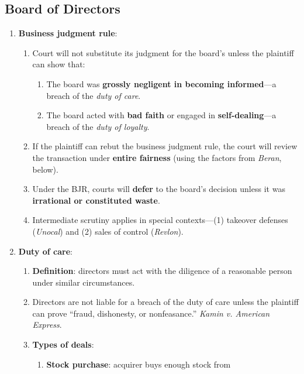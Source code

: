 \newpage

\subsection{Board of Directors}

\begin{enumerate}
    \item \textbf{Business judgment rule}:
    \begin{enumerate}
        \item Court will not substitute its judgment for the board's unless 
        the plaintiff can show that:
        \begin{enumerate}
             \item The board was \textbf{grossly negligent in becoming 
             informed}---a breach of the \emph{duty of care}.
             \item The board acted with \textbf{bad faith} or engaged in 
             \textbf{self-dealing}---a breach of the \emph{duty of loyalty}.
        \end{enumerate}
        \item If the plaintiff can rebut the business judgment rule, the court 
        will review the transaction under \textbf{entire fairness} (using the 
        factors from \emph{Beran}, below).
        \item Under the BJR, courts will \textbf{defer} to the board's decision 
        unless it was \textbf{irrational or constituted waste}.
        \item Intermediate scrutiny applies in special contexts---(1) takeover 
        defenses (\emph{Unocal}) and (2) sales of control (\emph{Revlon}).
    \end{enumerate}
    \item \textbf{Duty of care}:
    \begin{enumerate}
        \item \textbf{Definition}: directors must act with the diligence of a 
        reasonable person under similar circumstances.
        \item Directors are not liable for a breach of the duty of care 
        unless the plaintiff can prove ``fraud, dishonesty, or nonfeasance.'' 
        \emph{Kamin v. American Express}. %
        \item \textbf{Types of deals}:
        \begin{enumerate}
            \item \textbf{Stock purchase}: acquirer buys enough stock from 

\end{enumerate}
\end{enumerate}
\end{enumerate}
